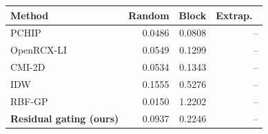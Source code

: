 \small
\begin{tabular}{lrrr}\toprule
Method & Random & Block & Extrap.\ \\\midrule
PCHIP & 0.0486 & 0.0808 & -- \\
OpenRCX-LI & 0.0549 & 0.1299 & -- \\
CMI-2D & 0.0534 & 0.1343 & -- \\
IDW & 0.1555 & 0.5276 & -- \\
RBF-GP & 0.0150 & 1.2202 & -- \\
\textbf{Residual gating (ours)} & 0.0937 & 0.2246 & -- \\
\bottomrule\end{tabular}
